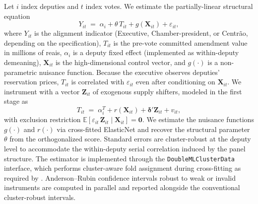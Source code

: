 \documentclass[preprint,12pt,authoryear]{elsarticle}
\begin{document}
Let $i$ index deputies and $t$ index votes. We estimate the partially-linear structural equation
\begin{equation}
Y_{it} \;=\; \alpha_i + \theta\, T_{it} + g(\mathbf{X}_{it}) + \varepsilon_{it},
\label{eq:y}
\end{equation}
where $Y_{it}$ is the alignment indicator (Executive, Chamber-president, or Centr\~ao, depending on the specification), $T_{it}$ is the pre-vote committed amendment value in millions of reais, $\alpha_i$ is a deputy fixed effect (implemented as within-deputy demeaning), $\mathbf{X}_{it}$ is the high-dimensional control vector, and $g(\cdot)$ is a non-parametric nuisance function. Because the executive observes deputies' reservation prices, $T_{it}$ is correlated with $\varepsilon_{it}$ even after conditioning on $\mathbf{X}_{it}$. We instrument with a vector $\mathbf{Z}_{it}$ of exogenous supply shifters, modeled in the first stage as
\begin{equation}
T_{it} \;=\; \alpha_i^{T} + r(\mathbf{X}_{it}) + \boldsymbol\delta'\mathbf{Z}_{it} + v_{it},
\label{eq:t}
\end{equation}
with exclusion restriction $\mathbb{E}[\varepsilon_{it}\,\mathbf{Z}_{it} \mid \mathbf{X}_{it}] = \mathbf{0}$. We estimate the nuisance functions $g(\cdot)$ and $r(\cdot)$ via cross-fitted ElasticNet \citep{Chernozhukov2018} and recover the structural parameter $\theta$ from the orthogonalized score. Standard errors are cluster-robust at the deputy level to accommodate the within-deputy serial correlation induced by the panel structure. The estimator is implemented through the \texttt{DoubleMLClusterData} interface, which performs cluster-aware fold assignment during cross-fitting as required by \citet{ChiangKatoMaSasaki2022}. Anderson--Rubin confidence intervals \citep{AndersonRubin1949} robust to weak or invalid instruments are computed in parallel and reported alongside the conventional cluster-robust intervals.
\end{document}
